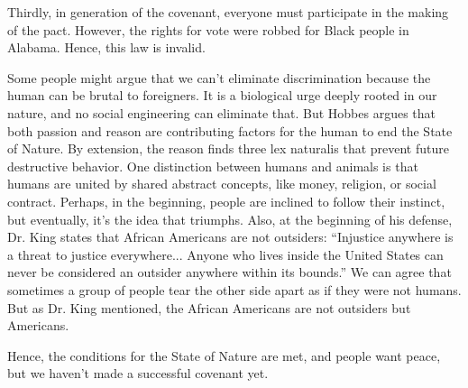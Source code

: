 \documentclass{article}
\begin{document}
Thirdly, in generation of the covenant, everyone must participate in the making of the pact. However, the rights for vote were robbed for Black people in Alabama. Hence, this law is invalid.

Some people might argue that we can't eliminate discrimination because the human can be brutal to foreigners. It is a biological urge deeply rooted in our nature, and no social engineering can eliminate that. But Hobbes argues that both passion and reason are contributing factors for the human to end the State of Nature. By extension, the reason finds three lex naturalis that prevent future destructive behavior. One distinction between humans and animals is that humans are united by shared abstract concepts, like money, religion, or social contract. Perhaps, in the beginning, people are inclined to follow their instinct, but eventually, it’s the idea that triumphs. Also, at the beginning of his defense, Dr. King states that African Americans are not outsiders: “Injustice anywhere is a threat to justice everywhere... Anyone who lives inside the United States can never be considered an outsider anywhere within its bounds.” We can agree that sometimes a group of people tear the other side apart as if they were not humans. But as Dr. King mentioned, the
African Americans are not outsiders but Americans.

Hence, the conditions for the State of Nature are met, and people want peace, but we haven't made a successful covenant yet.
\end{document}
